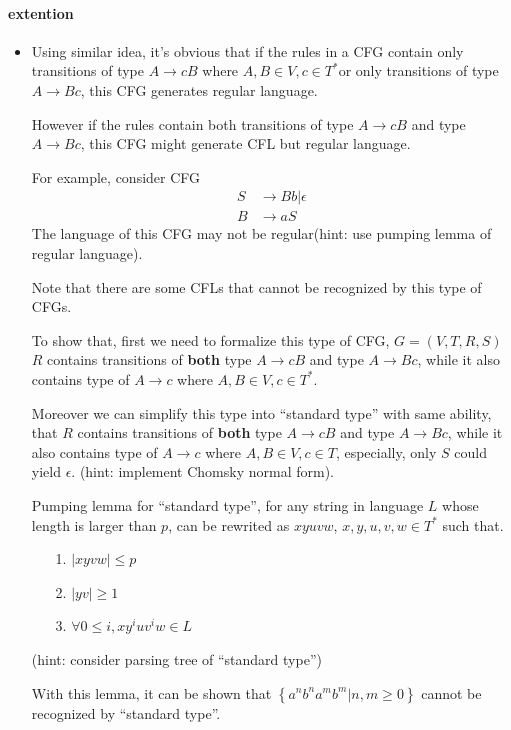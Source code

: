 \documentclass{article}
\begin{document}
    \paragraph*{extention}

    \begin{itemize}
        \item 
            Using similar idea, it's obvious that if the rules in a CFG contain only transitions of type $A \rightarrow cB$ where $A, B \in V, c \in T^{*}$or only transitions of type $A \rightarrow Bc$, this CFG generates regular language.

            However if the rules contain both transitions of type $A \rightarrow cB$ and type $A \rightarrow Bc$, this CFG might generate CFL but regular language.
        
            For example, consider CFG
            \begin{align*}
                S & \rightarrow Bb | \epsilon \\
                B & \rightarrow aS
            \end{align*}
            The language of this CFG may not be regular(hint: use pumping lemma of regular language). 
        
            Note that there are some CFLs that cannot be recognized by this type of CFGs.
        
            To show that, first we need to formalize this type of CFG, $G = (V, T, R, S)$
            $R$ contains transitions of \textbf{both} type $A \rightarrow cB$ and type $A \rightarrow Bc$, while it also contains type of $A \rightarrow c$ where $A,B \in V, c \in T^{*}$. 
            
            Moreover we can simplify this type into ``standard type'' with same ability, that $R$ contains transitions of \textbf{both} type $A \rightarrow cB$ and type $A \rightarrow Bc$, while it also contains type of $A \rightarrow c$ where $A,B \in V,c \in T$, especially, only $S$ could yield $\epsilon$. (hint: implement Chomsky normal form).
            
            Pumping lemma for ``standard type'', for any string in language $L$ whose length is larger than $p$, can be rewrited as $xyuvw$, $x, y, u, v, w \in T^{*}$ such that.
        
            \begin{itemize}
                \item[1.] $|xyvw| \leq p$
                \item[2.] $|yv| \geq 1$
                \item[3.] $\forall 0 \leq i,xy^{i}uv^{i}w \in L$  
            \end{itemize}
            (hint: consider parsing tree of ``standard type'')
            
            With this lemma, it can be shown that $\left\{ a^{n}b^{n}a^{m}b^{m} | n,m \geq 0 \right\}$ cannot be recognized by ``standard type''.
    \end{itemize}

    
\end{document}
